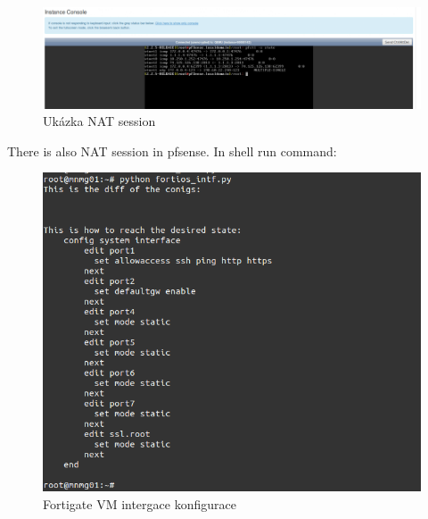 \begin{figure}[h]
\begin{centering}
\includegraphics[scale=0.45]{images/pfsense_nat}
\par\end{centering}
\caption{Ukázka NAT session\label{fig:pfsense_nat}}
\end{figure}

There is also NAT session in pfsense. In shell run command:

\begin{figure}[h]
\begin{centering}
\includegraphics[scale=0.45]{images/fortigate_int}
\par\end{centering}
\caption{Fortigate VM intergace konfigurace\label{fig:fortigate_int}}
\end{figure}

